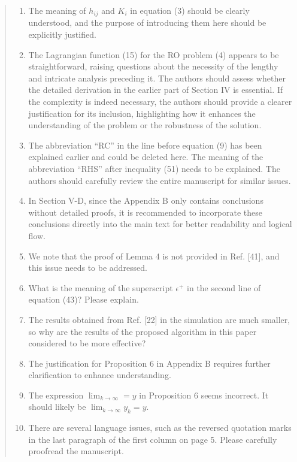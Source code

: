 \documentclass[journal,twoside,web]{ieeecolor}
\begin{document}
\begin{quote}
\begin{enumerate}
\item The meaning of $h_{ij}$ and $K_i$ in equation (3) should be clearly understood, and the purpose of introducing them here should be explicitly justified.

\item The Lagrangian function (15) for the RO problem (4) appears to be straightforward, raising questions about the necessity of the lengthy and intricate analysis preceding it. The authors should assess whether the detailed derivation in the earlier part of Section IV is essential. If the complexity is indeed necessary, the authors should provide a clearer justification for its inclusion, highlighting how it enhances the understanding of the problem or the robustness of the solution.

\item The abbreviation ``RC'' in the line before equation (9) has been explained earlier and could be deleted here. The meaning of the abbreviation ``RHS'' after inequality (51) needs to be explained. The authors should carefully review the entire manuscript for similar issues.

\item In Section V-D, since the Appendix B only contains conclusions without detailed proofs, it is recommended to incorporate these conclusions directly into the main text for better readability and logical flow.

\item We note that the proof of Lemma 4 is not provided in Ref. [41], and this issue needs to be addressed.

\item What is the meaning of the superscript $\epsilon^+$ in the second line of equation (43)? Please explain.

\item The results obtained from Ref. [22] in the simulation are much smaller, so why are the results of the proposed algorithm in this paper considered to be more effective?

\item The justification for Proposition 6 in Appendix B requires further clarification to enhance understanding.

\item The expression $\lim_{k \to \infty}=y$ in Proposition 6 seems incorrect. It should likely be $\lim_{k \to \infty} y_k=y$.

\item There are several language issues, such as the reversed quotation marks in the last paragraph of the first column on page 5. Please carefully proofread the manuscript.


\end{enumerate}
\end{quote}
\end{document}

